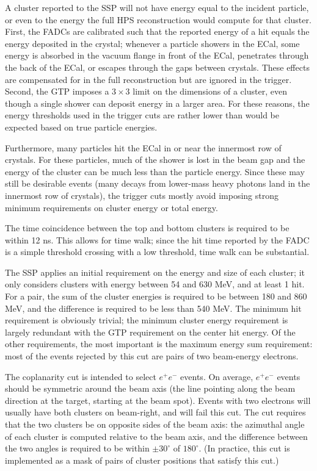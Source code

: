 A cluster reported to the SSP will not have energy equal to the incident particle, or even to the energy the full HPS reconstruction would compute for that cluster.
First, the FADCs are calibrated such that the reported energy of a hit equals the energy deposited in the crystal; whenever a particle showers in the ECal, some energy is absorbed in the vacuum flange in front of the ECal, penetrates through the back of the ECal, or escapes through the gaps between crystals.
These effects are compensated for in the full reconstruction but are ignored in the trigger.
Second, the GTP imposes a $3\times 3$ limit on the dimensions of a cluster, even though a single shower can deposit energy in a larger area.
For these reasons, the energy thresholds used in the trigger cuts are rather lower than would be expected based on true particle energies.

Furthermore, many particles hit the ECal in or near the innermost row of crystals.
For these particles, much of the shower is lost in the beam gap and the energy of the cluster can be much less than the particle energy.
Since these may still be desirable events (many decays from lower-mass heavy photons land in the innermost row of crystals), the trigger cuts mostly avoid imposing strong minimum requirements on cluster energy or total energy.

The time coincidence between the top and bottom clusters is required to be within 12 ns.
This allows for time walk; since the hit time reported by the FADC is a simple threshold crossing with a low threshold, time walk can be substantial.

The SSP applies an initial requirement on the energy and size of each cluster; it only considers clusters with energy between 54 and 630 MeV, and at least 1 hit.
For a pair, the sum of the cluster energies is required to be between 180 and 860 MeV, and the difference is required to be less than 540 MeV.
The minimum hit requirement is obviously trivial; the minimum cluster energy requirement is largely redundant with the GTP requirement on the center hit energy.
Of the other requirements, the most important is the maximum energy sum requirement: most of the events rejected by this cut are pairs of two beam-energy electrons.

The coplanarity cut is intended to select $e^+e^-$ events.
On average, $e^+e^-$ events should be symmetric around the beam axis (the line pointing along the beam direction at the target, starting at the beam spot).
Events with two electrons will usually have both clusters on beam-right, and will fail this cut.
The cut requires that the two clusters be on opposite sides of the beam axis: the azimuthal angle of each cluster is computed relative to the beam axis, and the difference between the two angles is required to be within $\pm 30^\circ$ of $180^\circ$.
(In practice, this cut is implemented as a mask of pairs of cluster positions that satisfy this cut.)

